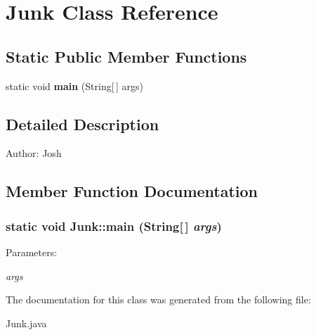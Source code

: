 \section{Junk Class Reference}
\label{class_junk}
\subsection*{Static Public Member Functions}
\begin{CompactItemize}
\item 
static void {\bf main} (String[$\,$] args)
\end{CompactItemize}


\subsection{Detailed Description}
\begin{Desc}
\item[Author:]Josh \end{Desc}




\subsection{Member Function Documentation}
\subsubsection{\setlength{\rightskip}{0pt plus 5cm}static void Junk::main (String[$\,$] {\em args})\hspace{0.3cm}{\tt  [inline, static]}}\label{class_junk_a88508c7425ff03cea9d2ec019e3b942}


\begin{Desc}
\item[Parameters:]
\begin{description}
\item[{\em args}]\end{description}
\end{Desc}


The documentation for this class was generated from the following file:\begin{CompactItemize}
\item 
Junk.java\end{CompactItemize}
